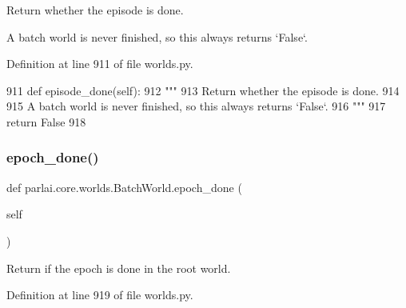 \begin{DoxyVerb}Return whether the episode is done.

A batch world is never finished, so this always returns `False`.
\end{DoxyVerb}
 

Definition at line 911 of file worlds.\+py.


\begin{DoxyCode}
911     \textcolor{keyword}{def }episode\_done(self):
912         \textcolor{stringliteral}{"""}
913 \textcolor{stringliteral}{        Return whether the episode is done.}
914 \textcolor{stringliteral}{}
915 \textcolor{stringliteral}{        A batch world is never finished, so this always returns `False`.}
916 \textcolor{stringliteral}{        """}
917         \textcolor{keywordflow}{return} \textcolor{keyword}{False}
918 
\end{DoxyCode}
\mbox{\label{classparlai_1_1core_1_1worlds_1_1BatchWorld_a006891b1446ef6e593edda1c91cab809}} 
\subsubsection{\texorpdfstring{epoch\+\_\+done()}{epoch\_done()}}
{\footnotesize\ttfamily def parlai.\+core.\+worlds.\+Batch\+World.\+epoch\+\_\+done (\begin{DoxyParamCaption}\item[{}]{self }\end{DoxyParamCaption})}

\begin{DoxyVerb}Return if the epoch is done in the root world.
\end{DoxyVerb}
 

Definition at line 919 of file worlds.\+py.


